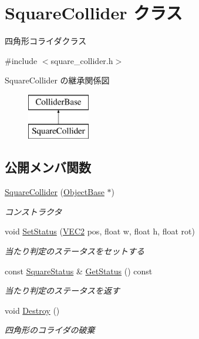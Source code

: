 \hypertarget{class_square_collider}{}\section{Square\+Collider クラス}
\label{class_square_collider}


四角形コライダクラス  




{\ttfamily \#include $<$square\+\_\+collider.\+h$>$}

Square\+Collider の継承関係図\begin{figure}[H]
\begin{center}
\leavevmode
\includegraphics[height=2.000000cm]{class_square_collider}
\end{center}
\end{figure}
\subsection*{公開メンバ関数}
\begin{DoxyCompactItemize}
\item 
\mbox{\hyperlink{class_square_collider_a002cb3de9da3aa637d46c0819449c31c}{Square\+Collider}} (\mbox{\hyperlink{class_object_base}{Object\+Base}} $\ast$)
\begin{DoxyCompactList}\small\item\em コンストラクタ \end{DoxyCompactList}\item 
void \mbox{\hyperlink{class_square_collider_ab5e57de1f1fddd5a6935e4ed8739b4b2}{Set\+Status}} (\mbox{\hyperlink{transform_8h_afb0c5e21d4133ff4f200992c0b534e1b}{V\+E\+C2}} pos, float w, float h, float rot)
\begin{DoxyCompactList}\small\item\em 当たり判定のステータスをセットする \end{DoxyCompactList}\item 
const \mbox{\hyperlink{struct_square_status}{Square\+Status}} \& \mbox{\hyperlink{class_square_collider_ac437bc1bed951c82ca25d2b17a7b2e0f}{Get\+Status}} () const
\begin{DoxyCompactList}\small\item\em 当たり判定のステータスを返す \end{DoxyCompactList}\item 
void \mbox{\hyperlink{class_square_collider_a83273e0e63692aa8020b8deedd456886}{Destroy}} ()
\begin{DoxyCompactList}\small\item\em 四角形のコライダの破棄 \end{DoxyCompactList}\end{DoxyCompactItemize}
